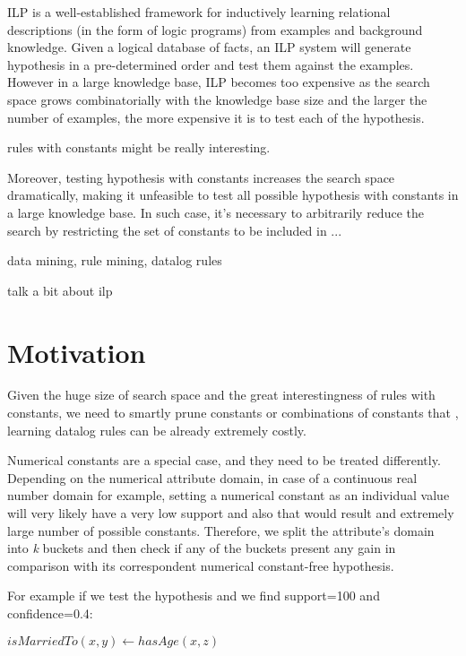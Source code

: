 
ILP is a well-established framework for inductively learning relational descriptions (in the form of logic programs) from examples and background knowledge. Given a logical database of facts, an ILP system will generate hypothesis in a pre-determined order and test them against the examples. However in a large knowledge base, ILP becomes too expensive as the search space grows combinatorially with the knowledge base size and the larger the number of examples, the more expensive it is to test each of the hypothesis.

rules with constants might be really interesting.


Moreover, testing hypothesis with constants increases the search space dramatically, making it unfeasible to test all possible hypothesis with constants in a large knowledge base. In such case, it's necessary to arbitrarily reduce the search by restricting the set of constants to be included in ...

data mining, rule mining, datalog rules



talk a bit about ilp

\section{Motivation}
Given the huge size of search space and the great interestingness of rules with constants, we need to smartly prune constants or combinations of constants that  , learning datalog rules can be already extremely costly.

Numerical constants are a special case, and they need to be treated differently. Depending on the numerical attribute domain, in case of a continuous real number domain for example, setting a numerical constant as an individual value will very likely have a very low support and also that would result and extremely large number of possible constants. Therefore, we split the attribute's domain into \emph{k} buckets and then check if any of the buckets present any gain in comparison with its correspondent numerical constant-free hypothesis.

For example if we test the hypothesis and we find support=100 and confidence=0.4:

\begin{center}
 \begin{math}isMarriedTo(x,y) \leftarrow hasAge(x,z)\end{math} 
\end{center}

